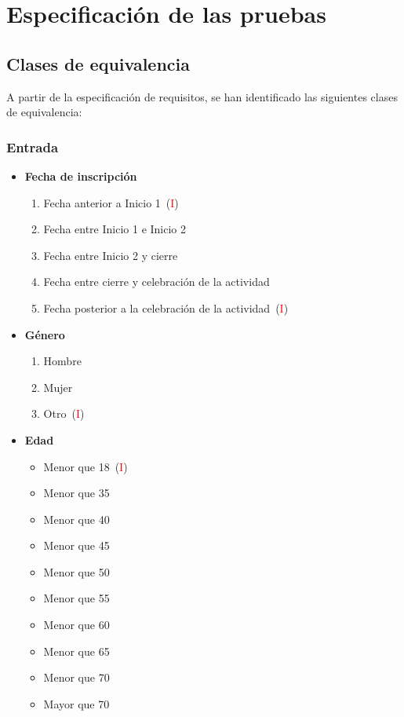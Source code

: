 \chapter{Especificación de las pruebas}

\section{Clases de equivalencia}
A partir de la especificación de requisitos, se han identificado las siguientes clases de equivalencia:

\subsection{Entrada}
\begin{itemize}
	\item \textbf{Fecha de inscripción}
		\begin{enumerate}
			\item Fecha anterior a Inicio 1~(\textcolor{red}{I})
			\item Fecha entre Inicio 1 e Inicio 2
			\item Fecha entre Inicio 2 y cierre
			\item Fecha entre cierre y celebración de la actividad
			\item Fecha posterior a la celebración de la actividad~(\textcolor{red}{I})
		\end{enumerate}
	\item \textbf{Género}
		\begin{enumerate}
			\item Hombre
			\item Mujer
			\item Otro~(\textcolor{red}{I})
		\end{enumerate}
	\item \textbf{Edad}
		\begin{itemize}
			\item Menor que 18~(\textcolor{red}{I})
			\item Menor que 35
			\item Menor que 40
			\item Menor que 45
			\item Menor que 50
			\item Menor que 55
			\item Menor que 60
			\item Menor que 65
			\item Menor que 70
			\item Mayor que 70

\end{itemize}
\end{itemize}
